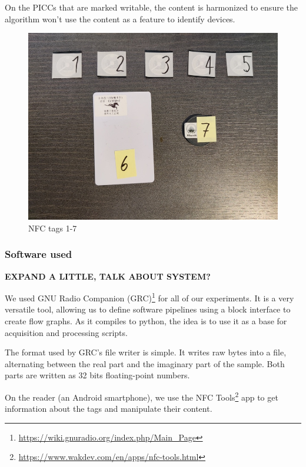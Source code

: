 On the PICCs that are marked writable, the content is harmonized to ensure the algorithm won't use the content as a feature to identify devices.

\begin{figure}[htp!]
  \centering
  \includegraphics[scale=0.35]{figures/data_standard-tags2.jpg}
  \caption{NFC tags 1-7}
  \label{fig:tags}
\end{figure}

\subsubsection{Software used}

\textbf{EXPAND A LITTLE, TALK ABOUT SYSTEM?}

We used GNU Radio Companion (GRC)\footnote{\url{https://wiki.gnuradio.org/index.php/Main_Page}} for all of our experiments. It is a very versatile tool, allowing us to define software pipelines using a block interface to create flow graphs. As it compiles to python, the idea is to use it as a base for acquisition and processing scripts.

The format used by GRC's file writer is simple. It writes raw bytes into a file, alternating between the real part and the imaginary part of the sample. Both parts are written as 32 bits floating-point numbers.

On the reader (an Android smartphone), we use the NFC Tools\footnote{\url{https://www.wakdev.com/en/apps/nfc-tools.html}} app to get information about the tags and manipulate their content.

